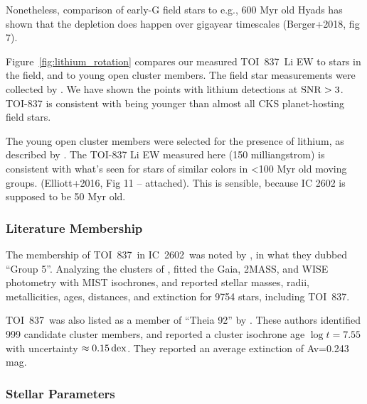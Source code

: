 \documentclass[12pt,twocolumn,tighten]{aastex62}
\newcommand{\tn}{TOI~837} %
\newcommand{\cn}{IC~2602} %
\begin{document}
Nonetheless, comparison of early-G field stars to e.g., 600 Myr old
Hyads has shown that the depletion does happen over gigayear timescales
(Berger+2018, fig 7).

Figure~\ref{fig:lithium_rotation} compares our measured \tn\ Li EW 
to stars in the field, and to young open cluster members.
The field star measurements were collected by
\citet{berger_identifying_2018}.
We have shown the points with lithium detections at ${\rm SNR}>3$.
TOI-837 is consistent with being younger than almost all CKS
planet-hosting field stars.

The young open cluster members were selected for the presence of
lithium, as described by \citet{randich_gaiaeso_2018}.
The TOI-837 Li EW measured here (150 milliangstrom) is consistent
with what's seen for stars of similar colors in <100 Myr old moving
groups.
(Elliott+2016, Fig 11 -- attached).  This is sensible, because
IC 2602 is supposed to be 50 Myr old.



\subsubsection{Literature Membership}
The membership of \tn\ in \cn\ was noted by \citet{oh_comoving_2017},
in what they dubbed ``Group 5''.
Analyzing the clusters of \citet{oh_comoving_2017},
\citet{bochanski_fundamental_2018} fitted the Gaia, 2MASS, and
WISE photometry with MIST isochrones, and reported stellar masses,
radii, metallicities, ages, distances, and extinction for 9754 stars,
including \tn.
%


\tn\ was also listed as a member of ``Theia 92'' by
\citet{kounkel_untangling_2019}.
These authors identified 999 candidate cluster members, and
reported a cluster isochrone age $\log t = 7.55$ with uncertainty
$\approx 0.15\,{\rm dex}$.
They reported an average extinction of Av=0.243 mag.


\subsubsection{Stellar Parameters}


\end{document}
